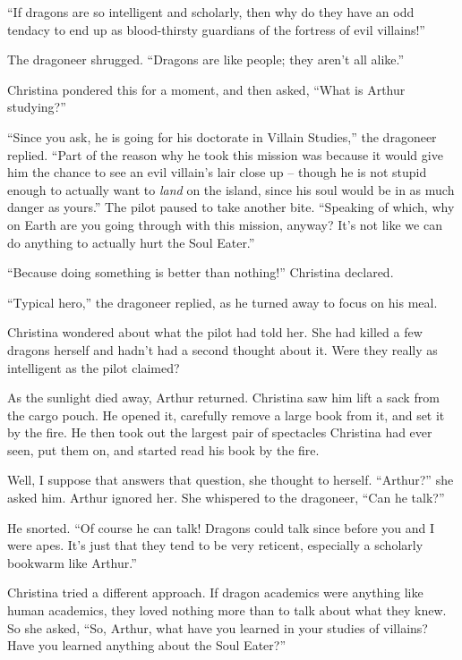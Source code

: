 \documentclass[showtrims,b6paper,draft,10pt]{memoir}
\begin{document}
``If dragons are so intelligent and scholarly, then why do they have an odd tendacy to end up as blood-thirsty guardians of the fortress of evil villains!''

The dragoneer shrugged.  ``Dragons are like people;  they aren't all alike.''

Christina pondered this for a moment, and then asked, ``What is Arthur studying?''

``Since you ask, he is going for his doctorate in Villain Studies,''  the dragoneer replied.  ``Part of the reason why he took this mission was because it would give him the chance to see an evil villain's lair close up -- though he is not stupid enough to actually want to \emph{land} on the island, since his soul would be in as much danger as yours.''  The pilot paused to take another bite.  ``Speaking of which, why on Earth are you going through with this mission, anyway?  It's not like we can do anything to actually hurt the Soul Eater.''

``Because doing something is better than nothing!'' Christina declared.

``Typical hero,'' the dragoneer replied, as he turned away to focus on his meal.

Christina wondered about what the pilot had told her.  She had killed a few dragons herself and hadn't had a second thought about it.  Were they really as intelligent as the pilot claimed?

As the sunlight died away, Arthur returned.  Christina saw him lift a sack from the cargo pouch.  He opened it, carefully remove a large book from it, and set it by the fire.  He then took out the largest pair of spectacles Christina had ever seen, put them on, and started read his book by the fire.

Well, I suppose that answers that question, she thought to herself.  ``Arthur?'' she asked him.  Arthur ignored her.  She whispered to the dragoneer, ``Can he talk?''

He snorted.  ``Of course he can talk!  Dragons could talk since before you and I were apes.  It's just that they tend to be very reticent, especially a scholarly bookwarm like Arthur.''

Christina tried a different approach.  If dragon academics were anything like human academics, they loved nothing more than to talk about what they knew.  So she asked, ``So, Arthur, what have you learned in your studies of villains?  Have you learned anything about the Soul Eater?''
\end{document}
